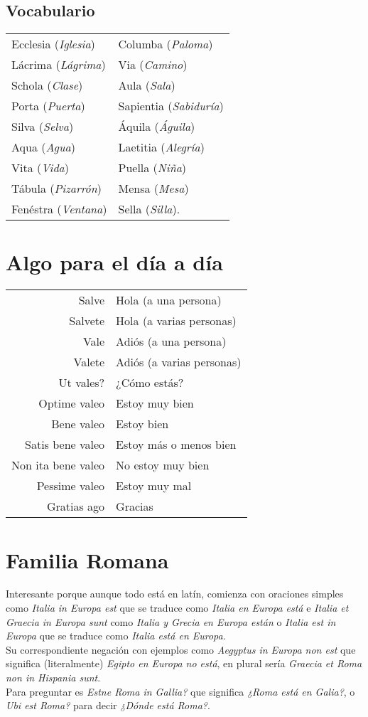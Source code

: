 \documentclass[landscape,12pt,twocolumn]{article} %
\begin{document}
\subsection{Vocabulario}
\begin{tabular}{ll}
Ecclesia (\emph{Iglesia}) & Columba (\emph{Paloma})\\
Lácrima (\emph{Lágrima}) & Via (\emph{Camino})\\
Schola (\emph{Clase}) & Aula (\emph{Sala})\\
Porta (\emph{Puerta}) & Sapientia (\emph{Sabiduría})\\
Silva (\emph{Selva}) & Áquila (\emph{Águila})\\
Aqua (\emph{Agua}) & Laetitia (\emph{Alegría})\\
Vita (\emph{Vida}) & Puella (\emph{Niña})\\
Tábula (\emph{Pizarrón}) & Mensa (\emph{Mesa})\\
Fenéstra (\emph{Ventana}) & Sella (\emph{Silla}).
\end{tabular}

\section{Algo para el día a día}
\begin{tabular}{rl}
Salve & Hola (a una persona)\\
Salvete & Hola (a varias personas)\\
Vale & Adiós (a una persona)\\
Valete & Adiós (a varias personas)\\
Ut vales? & ¿Cómo estás?\\
Optime valeo & Estoy muy bien\\
Bene valeo & Estoy bien\\
Satis bene valeo & Estoy más o menos bien\\
Non ita bene valeo & No estoy muy bien\\
Pessime valeo & Estoy muy mal\\
Gratias ago & Gracias
\end{tabular}

\section{Familia Romana}
Interesante porque aunque todo está en latín, comienza con oraciones simples como \emph{Italia in Europa est} que se traduce como \emph{Italia en Europa está} e \emph{Italia et Graecia in Europa sunt} como \emph{Italia y Grecia en Europa están} o \emph{Italia est in Europa} que se traduce como \emph{Italia está en Europa}.\\

Su correspondiente negación con ejemplos como \emph{Aegyptus in Europa non est} que significa (literalmente) \emph{Egipto en Europa no está}, en plural sería \emph{Graecia et Roma non in Hispania sunt}.\\

Para preguntar es \emph{Estne Roma in Gallia?} que significa \emph{¿Roma está en Galia?}, o \emph{Ubi est Roma?} para decir \emph{¿Dónde está Roma?}.\\

\tableofcontents
\end{document}

